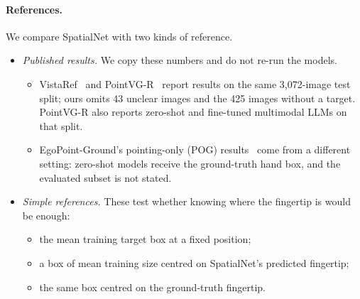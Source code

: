 \paragraph{References.} We compare SpatialNet with two kinds of reference.
\begin{itemize}
\item \emph{Published results.} We copy these numbers and do not re-run the models.
  \begin{itemize}
  \item VistaRef~\cite{li2026vistaref} and PointVG-R~\cite{li2026pointvgr} report results on the same 3,072-image test split; ours omits 43 unclear images and the 425 images without a target. PointVG-R also reports zero-shot and fine-tuned multimodal LLMs on that split.
  \item EgoPoint-Ground's pointing-only (POG) results~\cite{egopoint} come from a different setting: zero-shot models receive the ground-truth hand box, and the evaluated subset is not stated.
  \end{itemize}
\item \emph{Simple references.} These test whether knowing where the fingertip is would be enough:
  \begin{itemize}
  \item the mean training target box at a fixed position;
  \item a box of mean training size centred on SpatialNet's predicted fingertip;
  \item the same box centred on the ground-truth fingertip.
  \end{itemize}
\end{itemize}

